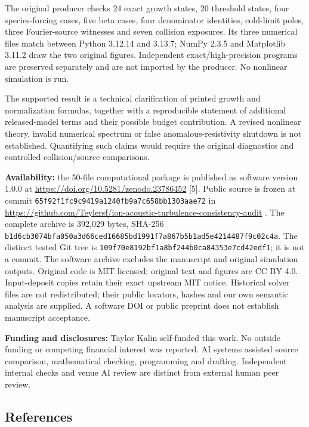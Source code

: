 The original producer checks 24 exact growth states, 20 threshold
states, four species-forcing cases, five beta cases, four denominator
identities, cold-limit poles, three Fourier-source witnesses and seven
collision exposures. Its three numerical files match between Python
3.12.14 and 3.13.7; NumPy 2.3.5 and Matplotlib 3.11.2 draw the two
original figures. Independent exact/high-precision programs are
preserved separately and are not imported by the producer. No nonlinear
simulation is run.

The supported result is a technical clarification of printed growth and
normalization formulas, together with a reproducible statement of
additional released-model terms and their possible budget contribution.
A revised nonlinear theory, invalid numerical spectrum or false
anomalous-resistivity shutdown is not established. Quantifying such
claims would require the original diagnostics and controlled
collision/source comparisons.

\textbf{Availability:} the 50-file computational package is published as
software version 1.0.0 at \url{https://doi.org/10.5281/zenodo.23786452}
{[}5{]}. Public source is frozen at commit
\nolinkurl{65f92f1fc9c9419a1240fb9a7c658bb1303aae72} in
\url{https://github.com/Teylersf/ion-acoustic-turbulence-consistency-audit}
. The complete archive is 392,029 bytes, SHA-256
\nolinkurl{b1d6cb3074bfa050a3d66ced16685bd1991f7a867b5b1ad5e4214487f9c02c4a}.
The distinct tested Git tree is
\nolinkurl{109f70e8192bf1a8bf244b0ca84353e7cd42edf1}; it is not a commit.
The software archive excludes the manuscript and original simulation
outputs. Original code is MIT licensed; original text and figures are CC
BY 4.0. Input-deposit copies retain their exact upstream MIT notice.
Historical solver files are not redistributed; their public locators,
hashes and our own semantic analysis are supplied. A software DOI or
public preprint does not establish manuscript acceptance.

\textbf{Funding and disclosures:} Taylor Kalin self-funded this work. No
outside funding or competing financial interest was reported. AI systems
assisted source comparison, mathematical checking, programming and
drafting. Independent internal checks and venue AI review are distinct
from external human peer review.

\clearpage
\begingroup\small\raggedright
\subsection{References}\label{references}

